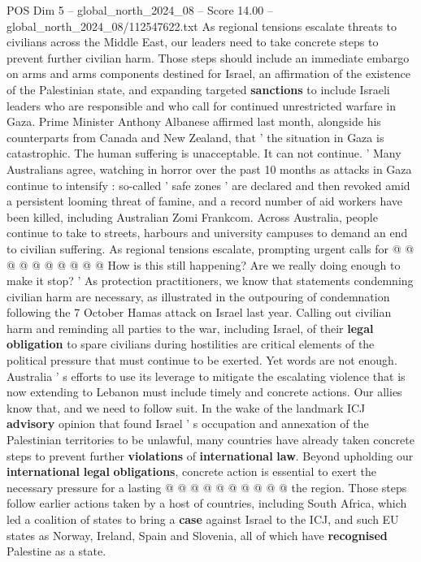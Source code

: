 \begin{textsample}{POS Dim 5 – global\_north\_2024\_08 – Score 14.00 – global\_north\_2024\_08/112547622.txt}  \label{ex:f5_pos_392}
As regional tensions escalate threats to civilians across the Middle East, our leaders need to take concrete steps to prevent further civilian harm.
Those steps should include an immediate embargo on arms and arms components destined for Israel, an affirmation of the existence of the Palestinian state, and expanding targeted \textbf{sanctions} to include Israeli leaders who are responsible and who call for continued unrestricted warfare in Gaza.
Prime Minister Anthony Albanese affirmed last month, alongside his counterparts from Canada and New Zealand, that ' the situation in Gaza is catastrophic.
The human suffering is unacceptable.
It can not continue. ' Many Australians agree, watching in horror over the past 10 months as attacks in Gaza continue to intensify : so-called ' safe zones ' are declared and then revoked amid a persistent looming threat of famine, and a record number of aid workers have been killed, including Australian Zomi Frankcom.
Across Australia, people continue to take to streets, harbours and university campuses to demand an end to civilian suffering.
As regional tensions escalate, prompting urgent calls for @ @ @ @ @ @ @ @ @ @ How is this still happening?
Are we really doing enough to make it stop? ' As protection practitioners, we know that statements condemning civilian harm are necessary, as illustrated in the outpouring of condemnation following the 7 October Hamas attack on Israel last year.
Calling out civilian harm and reminding all parties to the war, including Israel, of their \textbf{legal} \textbf{obligation} to spare civilians during hostilities are critical elements of the political pressure that must continue to be exerted.
Yet words are not enough.
Australia ' s efforts to use its leverage to mitigate the escalating violence that is now extending to Lebanon must include timely and concrete actions.
Our allies know that, and we need to follow suit.
In the wake of the landmark ICJ \textbf{advisory} opinion that found Israel ' s occupation and annexation of the Palestinian territories to be unlawful, many countries have already taken concrete steps to prevent further \textbf{violations} of \textbf{international} \textbf{law}.
Beyond upholding our \textbf{international} \textbf{legal} \textbf{obligations}, concrete action is essential to exert the necessary pressure for a lasting @ @ @ @ @ @ @ @ @ @ the region.
Those steps follow earlier actions taken by a host of countries, including South Africa, which led a coalition of states to bring a \textbf{case} against Israel to the ICJ, and such EU states as Norway, Ireland, Spain and Slovenia, all of which have \textbf{recognised} Palestine as a state.

\end{textsample}
